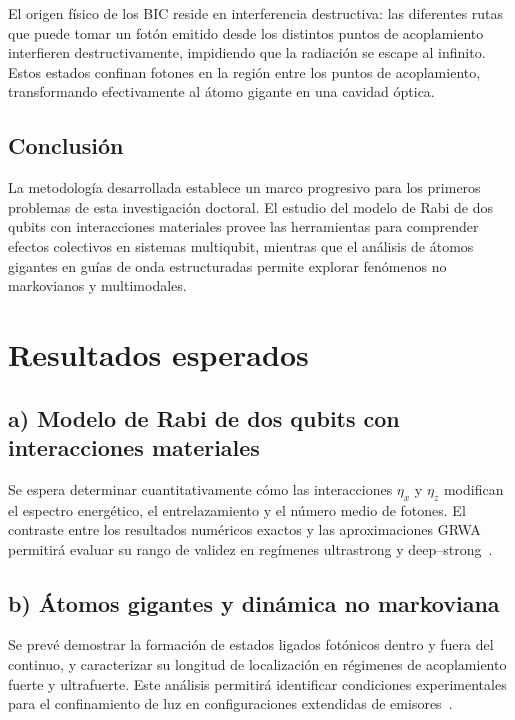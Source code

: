 \documentclass[onecolumn,notitlepage,letterpaper,aps,pra,12pt]{article}
\numberwithin{equation}{section}
\begin{document}
El origen físico de los BIC reside en interferencia destructiva: las diferentes rutas que puede tomar un fotón emitido desde los distintos puntos de acoplamiento interfieren destructivamente, impidiendo que la radiación se escape al infinito. Estos estados confinan fotones en la región entre los puntos de acoplamiento, transformando efectivamente al átomo gigante en una cavidad óptica.



\subsection{Conclusión }

La metodología desarrollada establece un marco  progresivo para los primeros problemas de esta investigación doctoral. El estudio del modelo de Rabi de dos qubits con interacciones materiales provee las herramientas  para comprender efectos colectivos en sistemas multiqubit, mientras que el análisis de átomos gigantes en guías de onda estructuradas permite explorar fenómenos no markovianos y multimodales.


\section{Resultados esperados}

\subsection*{a) Modelo de Rabi de dos qubits con interacciones materiales}
Se espera determinar cuantitativamente cómo las interacciones $\eta_x$ y $\eta_z$ modifican el espectro energético, el entrelazamiento y el número medio de fotones. El contraste entre los resultados numéricos exactos y las aproximaciones GRWA permitirá evaluar su rango de validez en regímenes ultrastrong y deep–strong~\cite{Chilingaryan2013,Mao2019}.

\subsection*{b) Átomos gigantes y dinámica no markoviana}
Se prevé demostrar la formación de estados ligados fotónicos dentro y fuera del continuo, y caracterizar su longitud de localización en régimenes de acoplamiento fuerte y ultrafuerte. Este análisis permitirá identificar condiciones experimentales para el confinamiento de luz en configuraciones extendidas de emisores~\cite{gonzalez2025}.
\end{document}
